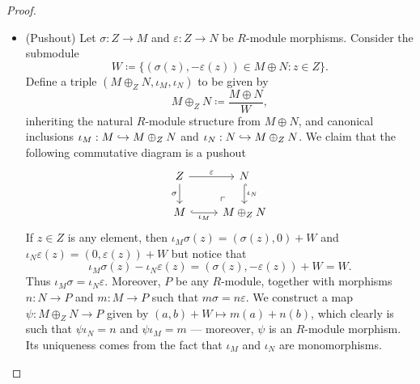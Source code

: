 \begin{proof}
\begin{itemize}
\item (Pushout) Let \(\sigma: Z \to M\) and \(\varepsilon: Z \to N\) be
  \(R\)-module morphisms. Consider the submodule
  \[
  W \coloneq \{(\sigma(z), -\varepsilon(z)) \in M \oplus N \colon
  z \in Z\}.
  \]
  Define a triple \((M \oplus_Z N, \iota_M, \iota_N)\)
  to be given by
  \[
  M \oplus_Z N \coloneq \frac{M \oplus N}{W},
  \]
  inheriting the natural \(R\)-module structure from \(M \oplus N\), and
  canonical inclusions \(\iota_M: M \hookrightarrow M \oplus_Z N\) and
  \(\iota_N: N \hookrightarrow M \oplus_Z N\). We claim that the following commutative
  diagram is a pushout
  \[
  \begin{tikzcd}
  Z \ar[r, "\varepsilon"] \ar[d, "\sigma"']
  \ar[dr, very near end, phantom, "\ulcorner"]
  &N \ar[d, hook, "\iota_N"] \\
  M \ar[r, hook, "\iota_M"'] &M \oplus_Z N
  \end{tikzcd}
  \]
  If \(z \in Z\) is any element, then  \(\iota_M\sigma(z) = (\sigma(z), 0) + W\)
  and \(\iota_N \varepsilon(z) = (0, \varepsilon(z)) + W\) but notice that
  \[
  \iota_M \sigma(z) - \iota_N \varepsilon(z)
  = (\sigma(z), - \varepsilon(z)) + W
  = W.
  \]
  Thus \(\iota_M \sigma = \iota_N \varepsilon\). Moreover, \(P\) be any
  \(R\)-module, together with morphisms \(n: N \to P\) and \(m: M \to P\) such
  that \(m \sigma = n \varepsilon\).  We construct a map
  \(\psi: M \oplus_Z N \to P\) given by \((a, b) + W \mapsto m(a) + n(b)\),
  which clearly is such that \(\psi \iota_N = n\) and \(\psi \iota_M = m\) ---
  moreover, \(\psi\) is an \(R\)-module morphism. Its uniqueness comes from the
  fact that \(\iota_M\) and \(\iota_N\) are monomorphisms.
\end{itemize}
\end{proof}

